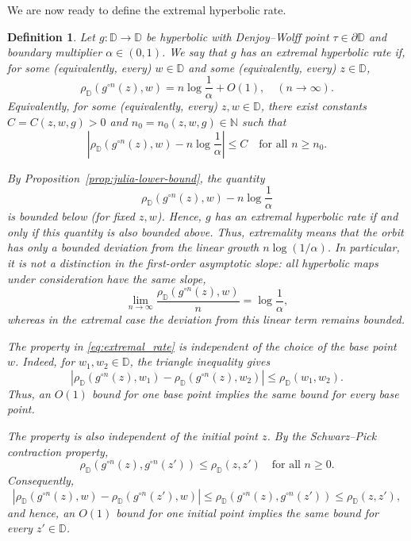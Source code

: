 \documentclass[10pt,a4paper]{amsart}
\numberwithin{equation}{section}
\newtheorem{definition}[equation]{Definition}
\begin{document}
We are now ready to define the extremal hyperbolic rate.

\begin{definition}
\label{def:extremal_rate}
Let $g:\mathbb{D}\to\mathbb{D}$ be hyperbolic with Denjoy--Wolff point
$\tau\in\partial\mathbb{D}$ and boundary multiplier
$\alpha\in(0,1)$. We say that $g$ has an
\emph{extremal hyperbolic rate} if, for some (equivalently, every)
$w\in\mathbb{D}$ and some (equivalently, every) $z\in\mathbb{D}$,
\begin{equation}
\label{eq:extremal_rate}
\rho_{\mathbb{D}}(g^{\circ n}(z),w)
=
n\log\frac{1}{\alpha}+O(1),
\quad (n\to\infty).
\end{equation}
Equivalently, for some (equivalently, every) $z,w\in\mathbb{D}$,
there exist constants $C=C(z,w,g)>0$ and
$n_0=n_0(z,w,g)\in\mathbb{N}$ such that
\begin{equation*}
\left|
\rho_{\mathbb{D}}(g^{\circ n}(z),w)
-
n\log\frac{1}{\alpha}
\right|
\le C
\quad\text{for all }n\ge n_0.
\end{equation*}

By Proposition~\ref{prop:julia-lower-bound}, the quantity
\begin{equation*}
\rho_{\mathbb{D}}(g^{\circ n}(z),w)
-
n\log\frac{1}{\alpha}
\end{equation*}
is bounded below (for fixed $z,w$). Hence, $g$ has an extremal
hyperbolic rate if and only if this quantity is also bounded above.
Thus, extremality means that the orbit has only a bounded deviation
from the linear growth $n\log(1/\alpha)$. In particular, it is not a
distinction in the first-order asymptotic slope: all hyperbolic maps
under consideration have the same slope,
\begin{equation*}
\lim_{n\to\infty}
\frac{\rho_{\mathbb{D}}(g^{\circ n}(z),w)}{n}
=
\log\frac{1}{\alpha},
\end{equation*}
whereas in the extremal case the deviation from this linear term
remains bounded.

The property in \eqref{eq:extremal_rate} is independent of the choice
of the base point $w$. Indeed, for $w_1,w_2\in\mathbb{D}$, the triangle
inequality gives
\begin{equation*}
\left|
\rho_{\mathbb{D}}(g^{\circ n}(z),w_1)
-
\rho_{\mathbb{D}}(g^{\circ n}(z),w_2)
\right|
\le
\rho_{\mathbb{D}}(w_1,w_2).
\end{equation*}
Thus, an $O(1)$ bound for one base point implies the same bound for every base point.

The property is also independent of the initial point $z$. By the
Schwarz--Pick contraction property,
\begin{equation*}
\rho_{\mathbb{D}}(g^{\circ n}(z),g^{\circ n}(z'))
\le
\rho_{\mathbb{D}}(z,z')
\quad\text{for all }n\ge0.
\end{equation*}
Consequently,
\begin{equation*}
\left|
\rho_{\mathbb{D}}(g^{\circ n}(z),w)
-
\rho_{\mathbb{D}}(g^{\circ n}(z'),w)
\right|
\le
\rho_{\mathbb{D}}(g^{\circ n}(z),g^{\circ n}(z'))
\le
\rho_{\mathbb{D}}(z,z'),
\end{equation*}
and hence, an $O(1)$ bound for one initial point implies the same
bound for every $z'\in\mathbb{D}$.
\end{definition}
\end{document}
